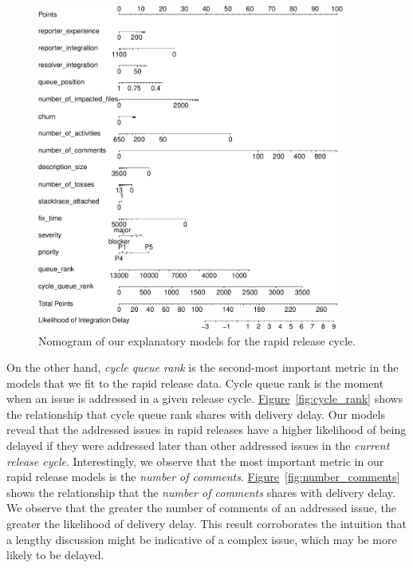 \begin{sloppypar}
\begin{figure}[!]
	\includegraphics[width=0.90\textwidth,keepaspectratio]
	{chapters/chapter5/figures/rq3/nomogram_rapid.pdf}
	\caption{Nomogram of our explanatory models for the rapid release cycle.}
	\label{fig:nomogram_rapid}
\end{figure}

On the other hand, \textit{cycle queue rank} is the second-most important metric
in the models that we fit to the rapid release data. Cycle queue rank is the
moment when an issue is addressed in a given release cycle.
\hyperref[fig:cycle_rank]{Figure}~\ref{fig:cycle_rank} shows the relationship that cycle queue rank shares
with delivery delay. Our models reveal that the addressed issues in rapid
releases have a higher likelihood of being delayed if they were addressed later
than other addressed issues in the \textit{current release cycle}.
Interestingly, we observe that the most important metric in our rapid release
models is the \textit{number of comments}.
\hyperref[fig:number_comments]{Figure}~\ref{fig:number_comments}
shows the relationship that the \textit{number of comments} shares with
delivery delay. We observe that the greater the number of comments of an
addressed issue, the greater the likelihood of delivery delay. This result
corroborates the intuition that a lengthy discussion might be indicative of a
complex issue, which may be more likely to be delayed.


\end{sloppypar}
